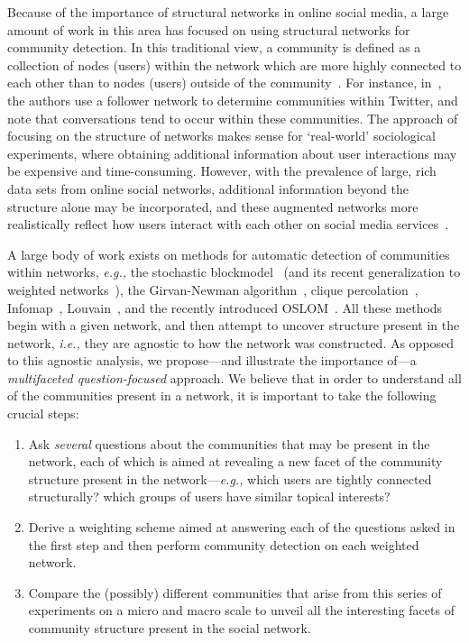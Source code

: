 \documentclass[10pt,letterpaper]{article}
\begin{document}
Because of the importance of structural networks in online social media, a large amount of work in this area has focused on using structural networks for community detection. In this traditional view, a community is defined as a collection of nodes (users) within the network which are more highly connected to each other than to nodes (users) outside of the community~\cite{girvan2002a, newman2004finding}. For instance, in~\cite{java2009we}, the authors use a follower network to determine communities within Twitter, and note that conversations tend to occur within these communities. The approach of focusing on the structure of networks makes sense for `real-world' sociological experiments, where obtaining additional information about user interactions may be expensive and time-consuming. However, with the prevalence of large, rich data sets from online social networks, additional information beyond the structure alone may be incorporated, and these augmented networks more realistically reflect how users interact with each other on social media services~\cite{nguyen2011adaptive,grabowicz2012social}.

A large body of work exists on methods for automatic detection of communities within networks, {\it e.g.,} the stochastic blockmodel~\cite{Holland1983} (and its recent generalization to weighted networks~\cite{Aicher26062014}), the Girvan-Newman algorithm~\cite{newman2004finding}, clique percolation~\cite{PalEtAl05}, Infomap~\cite{Rosvall08mapsof}, Louvain~\cite{blondel2008fast}, and the recently introduced OSLOM~\cite{LancichinettiPlos}.
All these methods begin with a given network, and then attempt to uncover structure present in the network, \emph{i.e.,} they are agnostic to how the network was constructed.
As opposed to this agnostic analysis, we propose---and illustrate the importance of---a \emph{multifaceted question-focused} approach. We believe that in order to understand all of the communities present in a network, it is important to take the following crucial steps: 
\begin{enumerate}

\item Ask \emph{several} questions about the communities that may be present in the network, each of which is aimed at revealing a new facet of the community structure present in the network---{\it e.g.,} which users are tightly connected structurally? which groups of users have similar topical interests?

\item Derive a weighting scheme aimed at answering each of the questions asked in the first step and then perform community detection on each weighted network.
\item Compare the (possibly) different communities that arise from this series of experiments on a micro and macro scale to unveil all the interesting facets of community structure present in the social network. 
\end{enumerate}
\end{document}
